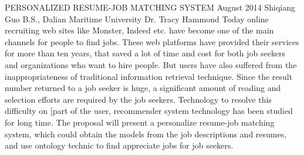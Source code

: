\begingroup
\absone
{PERSONALIZED RESUME-JOB MATCHING SYSTEM}
{August 2014}
{Shiqiang Guo}
{B.S., Dalian Maritime University}  %
{Dr. Tracy Hammond}%
{
Today online recruiting web sites like Monster, Indeed etc. have become one of the main channels for people to find jobs. These web platforms have provided their services for more than ten years, that saved a lot of time and cost for both job seekers and organizations who want to hire people. But users have also suffered  from  the inappropriateness  of  traditional  information  retrieval  technique. Since the result number returned to a job seeker is huge, a significant amount of reading and selection efforts are required by the job seekers. Technology to resolve this difficulty on [part of the user, recommender system technology has been studied for long time.  The  proposal will  present  a  personalize resume-job matching system, which could obtain the models from the job descriptions and resumes, and use ontology technic to find appreciate jobs for job seekers.
}
\endgroup



